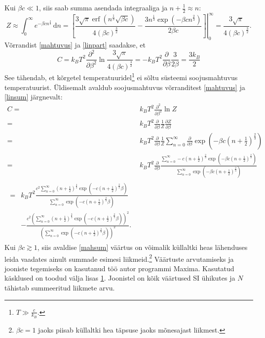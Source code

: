 \documentclass{trkut}%
\DeclareMathOperator{\erf}{erf}
\begin{document}
Kui $\beta c\ll 1$, siis saab summa asendada integraaliga ja $n+\frac{1}{2}\approx n$:
\begin{equation}
    Z \approx \int_0^\infty e^{-\beta c n^\frac{2}{3}} \, \mathrm{d}n = \left.\left[ \frac{3\sqrt{\pi}  \erf{\left( {n}^\frac{1}{3} \sqrt{\beta c}\right)} }{4 (\beta c)^\frac{3}{2}}-\frac{3n^\frac{1}{3} \exp\left(-\beta cn^\frac{2}{3}\right)}{2 \beta c }\right]\right|^{\infty}_{0} =\frac{3\sqrt{\pi}}{4(\beta c)^\frac{3}{2}} .
    \label{linpart}
\end{equation}
Võrrandist \eqref{mahtuvus} ja \eqref{linpart} saadakse, et
\begin{equation} \label{intmahtuvus}
    C=k_B T^2 \frac{\partial^2}{\partial \beta^2} \ln \frac{3\sqrt{\pi}}{4(\beta c)^\frac{3}{2}}=-k_BT^2\frac{\partial}{\partial \beta} \frac{3}{2\beta}=\frac{3k_B}{2}
\end{equation}
See tähendab, et kõrgetel temperatuuridel\footnote{$T\gg \frac{c}{k_B}$.} ei sõltu süsteemi soojusmahtuvus temperatuurist.
Üldisemalt avaldub soojusmahtuvus võrranditest \eqref{mahtuvus} ja \eqref{linsum} järgnevalt:
\begin{align}
    C={}&k_B T^2 \frac{\partial^2}{\partial \beta^2} \ln Z \nonumber \\
    ={}&k_B T^2\frac{\partial}{\partial \beta}\frac{1}{Z} \frac{\partial Z}{\partial \beta} \nonumber \\
    ={}&k_B T^2\frac{\partial}{\partial \beta}\frac{1}{Z} \sum_{n=0}^{\infty} \frac{\partial}{\partial \beta} \exp \left( -\beta c \left(n+\frac{1}{2}\right)^\frac{2}{3} \right) \nonumber \\
    ={}&k_B T^2\frac{\partial}{\partial \beta} \frac{\sum_{n=0}^{\infty} -c\left(n+\frac{1}{2}\right)^\frac{2}{3} \exp \left( -\beta c \left(n+\frac{1}{2}\right)^\frac{2}{3} \right)}{\sum_{n=0}^{\infty} \exp \left( -\beta c \left(n+\frac{1}{2}\right)^\frac{2}{3} \right)} \nonumber \\
    \begin{split}\label{mahsum}
        ={}&k_B T^2 \frac{c^2 \sum_{n=0}^\infty \left( n+\frac{1}{2}\right)^\frac{4}{3} \exp \left( -c \left( n+\frac{1}{2} \right)^\frac{2}{3} \beta \right) }{\sum_{n=0}^\infty {{\exp}\left( -c {{\left( n+\frac{1}{2}\right) }^{\frac{2}{3}}} \beta \right)}}  \\
        & - \frac{c^2 \left( \sum_{n=0}^{\infty }{{{\left( n+\frac{1}{2}\right) }^{\frac{2}{3}}} {{ \exp}\left( -c {{\left( n+\frac{1}{2}\right) }^{\frac{2}{3}}} \beta \right)}}\right)^{2}}{{{\left( \sum_{n=0}^{\infty }{ {{\exp}\left( -c {{\left( n+\frac{1}{2}\right) }^{\frac{2}{3}}} \beta \right)}}\right) }^{2}}}.
    \end{split}
\end{align}
Kui $\beta c \gtrsim 1$, siis avaldise \eqref{mahsum} väärtus on võimalik küllaltki heas lähenduses leida vaadates ainult summade esimesi liikmeid.\footnote{$\beta c =1$ jaoks piisab küllaltki hea täpsuse jaoks mõnesajast liikmest.}
Väärtuste arvutamiseks ja jooniste tegemiseks on kasutanud töö autor programmi Maxima.
Kasutatud käsklused on toodud välja lisas \hyperref[maximalisa]{1}.
Joonistel on kõik väärtused SI ühikutes ja $N$ tähistab summeeritud liikmete arvu.
\end{document}
